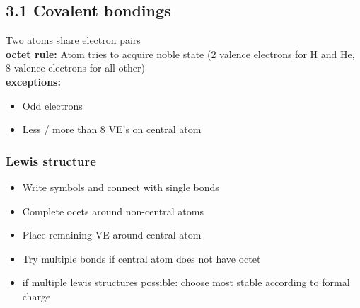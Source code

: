 \subsection{3.1 Covalent bondings}
    Two atoms share electron pairs\\
    \textbf{octet rule:} Atom tries to acquire noble state (2 valence electrons for H and He, 8 valence electrons for all other)\\
    \textbf{exceptions:} 
    \begin{itemize}
        \itemsep0em
        \item Odd electrons
        \item Less / more than 8 VE's on central atom
    \end{itemize}
\subsubsection{Lewis structure}
    \begin{itemize}
        \itemsep0em
        \item Write symbols and connect with single bonds
        \item Complete ocets around non-central atoms
        \item Place remaining VE around central atom
        \item Try multiple bonds if central atom does not have octet
        \item if multiple lewis structures possible: choose most stable according to formal charge
        
    \end{itemize}